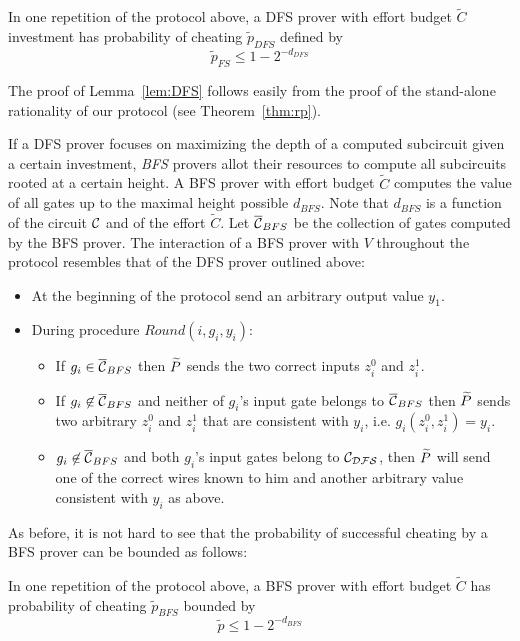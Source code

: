 \begin{mylemma}
\label{lem:DFS}
In one repetition of the protocol above, a DFS prover with effort budget $\tilde{C}$ investment has probability of cheating $\tilde{p}_{DFS}$ defined by 
$$ \tilde{p}_{FS} \leq 1 - 2^{-d_{DFS}}$$
\end{mylemma}

The proof of Lemma~\ref{lem:DFS} follows easily from the proof of the stand-alone rationality of our protocol (see Theorem~\ref{thm:rp}). 

If a DFS prover focuses on maximizing the depth of a computed subcircuit given a certain investment, \emph{BFS} provers allot their resources to compute all subcircuits rooted at a certain height.
A BFS prover with effort budget $\tilde{C}$ computes the value of all gates up to the maximal height possible $d_{BFS}$. Note that $d_{BFS}$ is 
a function of the circuit $\cal C$ and of the effort $\tilde{C}$.  Let $ \overline{\cal{C}}_{BFS}$ be the 
collection of gates computed by the BFS prover. 
The interaction of a BFS prover with $V$ throughout the protocol resembles that of the DFS prover outlined above:
\begin{itemize}
	\item At the beginning of the protocol send an arbitrary output value $y_1$.
	\item During procedure $Round(i, g_i, y_i)$:
	\begin{itemize}
		\item If $g_i \in \overline{\cal{C}}_{BFS}$  then $\widetilde{P}$ sends the two correct inputs $z^0_i$ and $z^1_i$.
		\item If $g_i \not \in \overline{\cal{C}}_{BFS}$ and neither of $g_i$'s input gate belongs to $\overline{\cal{C}}_{BFS}$ then $\widetilde{P}$ sends two arbitrary $z^0_i$ and $z^1_i$ that are consistent with $y_i$, i.e. $g_i(z^0_i,z^1_i) = y_i$.
		\item $g_i \not \in \overline{\cal{C}}_{BFS}$ and both $g_i$'s input gates belong to $\cal{C}_{DFS}$, then $\widetilde{P}$ will send one of the correct wires known to him and another arbitrary value consistent with $y_i$ as above.
	\end{itemize} 
\end{itemize}
As before, it is not hard to see that the probability of successful cheating by a BFS prover can be bounded as follows: 

\begin{mylemma}
\label{lem:BFS}
	In one repetition of the protocol above, a BFS prover with effort budget $\tilde{C}$ has probability of cheating $\tilde{p}_{BFS}$ bounded by
	$$ \tilde{p} \leq 1 - 2^{-d_{BFS}}$$
\end{mylemma}

